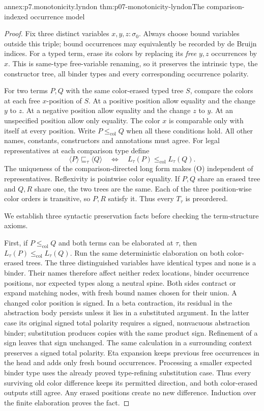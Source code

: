 \begin{annexitem}{annex:p7.monotonicity.lyndon}
 {thm:p07-monotonicity-lyndon}{The comparison-indexed occurrence model}
\begin{proof}
Fix three distinct variables \(x,y,z:\sigma_0\).
Always choose bound variables outside this triple; bound occurrences may
equivalently be recorded by de Bruijn indices.
For a typed term, erase its colors by replacing its \emph{free}
\(y,z\) occurrences by \(x\). This is same-type free-variable renaming,
so it preserves the intrinsic type, the constructor tree, all binder
types and every corresponding occurrence polarity.

For two terms \(P,Q\) with the same color-erased typed tree \(S\),
compare the colors at each free \(x\)-position of \(S\).
At a positive position allow equality and the change \(y\) to \(z\).
At a negative position allow equality and the change \(z\) to \(y\).
At an unspecified position allow only equality.
The color \(x\) is comparable only with itself at every position.
Write \(P\leq_{\mathrm{col}}Q\) when all these conditions hold.
All other names, constants, constructors and annotations must agree.
For legal representatives at each comparison type define
\[
 \langle P\rangle\sqsubseteq_\tau\langle Q\rangle
 \quad\Longleftrightarrow\quad
 L_\tau(P)\leq_{\mathrm{col}}L_\tau(Q).
 \tag{O}
\]
The uniqueness of the comparison-directed long form makes (O)
independent of representatives.
Reflexivity is pointwise color equality. If \(P,Q\) share an erased tree
and \(Q,R\) share one, the two trees are the same. Each of the three
position-wise color orders is transitive, so \(P,R\) satisfy it.
Thus every \(T_\tau\) is preordered.

We establish three syntactic preservation facts before checking the
term-structure axioms.

First, if \(P\leq_{\mathrm{col}}Q\) and both terms can be elaborated
at \(\tau\), then
\(L_\tau(P)\leq_{\mathrm{col}}L_\tau(Q)\).
Run the same deterministic elaboration on both color-erased trees.
The three distinguished variables have identical types and none is a
binder. Their names therefore affect neither redex locations, binder
occurrence positions, nor expected types along a neutral spine.
Both sides contract or expand matching nodes, with fresh bound names
chosen for their union.
A changed color position is signed. In a beta contraction, its residual
in the abstraction body persists unless it lies in a substituted argument.
In the latter case its original signed total polarity requires a signed,
nonvacuous abstraction binder; substitution produces copies with the same
product sign. Refinement of a sign leaves that sign unchanged.
The same calculation in a surrounding context preserves a signed total
polarity. Eta expansion keeps previous free occurrences in the head and
adds only fresh bound occurrences. Processing a smaller expected binder
type uses the already proved type-refining substitution case.
Thus every surviving old color difference keeps its permitted direction,
and both color-erased outputs still agree. Any erased positions create
no new difference. Induction over the finite elaboration proves the fact.


\end{proof}
\end{annexitem}
